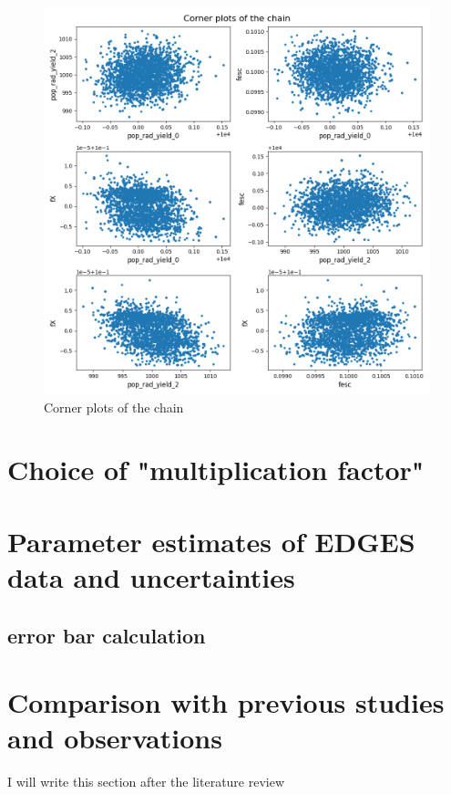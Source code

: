 \documentclass[12pt, TexShade, letterpaper]{report}
\begin{document}
\begin{figure}[h!]
\centering
\includegraphics[scale =0.6]{corner_plots_known_curve.png}
\caption[Corner plots of the chain]{Corner plots of the chain}
\label{fig:corner_plots_known_curve}
\end{figure}
\section{Choice of "multiplication factor"}
\section{Parameter estimates of EDGES data and uncertainties}
\subsection{error bar calculation}
\section{Comparison with previous studies and observations}
I will write this section after the literature review
\end{document}
